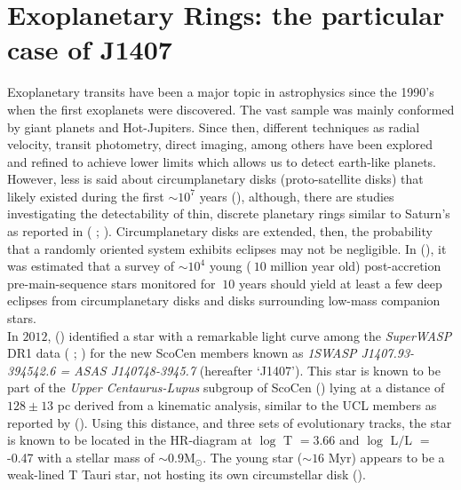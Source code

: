 \section{Exoplanetary Rings: the particular case of J1407}\label{sec:Exorings}


Exoplanetary transits have been a major topic in astrophysics since the 1990's when the first exoplanets were discovered. The vast sample was mainly conformed by giant planets and Hot-Jupiters. Since then, different techniques as radial velocity, transit photometry, direct imaging, among others have been explored and refined to achieve lower limits which allows us to detect earth-like planets. However, less is said about circumplanetary disks (proto-satellite disks) that likely existed during the first $\sim10^7$ years  (\citeyear{2012AJ....143...72M}), although, there are studies investigating the detectability of thin, discrete planetary rings similar to Saturn's as reported in ( \citeyear{2004ApJ...616.1193B};  \citeyear{2009ApJ...690....1O}). Circumplanetary disks are extended, then, the probability that a randomly oriented system exhibits eclipses may not be negligible. In  (\citeyear{2012AJ....143...72M}), it was estimated that a survey of $\sim10^4$ young ($~10$ million year old) post-accretion pre-main-sequence stars monitored for $~10$ years should yield at least a few deep eclipses from circumplanetary disks and disks surrounding low-mass companion stars.\\
 
In $2012$,  (\citeyear{2012AJ....143...72M}) identified a star with a remarkable light curve among the \textit{SuperWASP} DR1 data ( \citeyear{2006PASP..118.1407P};  \citeyear{2010A&A...520L..10B}) for the new ScoCen members known as \textit{1SWASP J1407.93-394542.6 = ASAS J140748-3945.7} (hereafter `J1407'). This star is known to be part of the \textit{Upper Centaurus-Lupus} subgroup of ScoCen  (\citeyear{1999AJ....117..354D}) lying at a distance of $128\pm13$ pc derived from a kinematic analysis, similar to the UCL members as reported by  (\citeyear{2012AJ....143...72M}). Using this distance, and three sets of evolutionary tracks, the star is known to be located in the HR-diagram at $\log$ T $= 3.66$ and $\log$ L$/$L $=$ -0.47 with a stellar mass of $\sim0.9$M$_\odot$. The young star ($\sim 16$ Myr) appears to be a weak-lined T Tauri star, not hosting its own circumstellar disk  (\citeyear{2015MNRAS.446..411K}). \\ 

